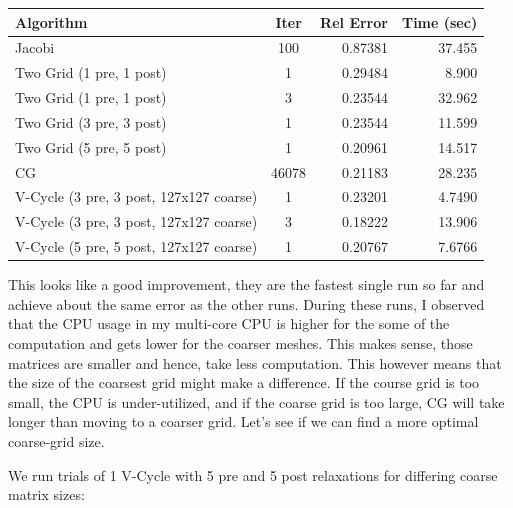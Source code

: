 \documentclass[11pt]{article}
\begin{document}
\begin{center}
\begin{tabular}{lcrr}
  Algorithm & Iter & Rel Error & Time (sec) \\
  \hline
  Jacobi                                  & 100   &  0.87381  & 37.455 \\
  Two Grid (1 pre, 1 post)                & 1	    &  0.29484  &  8.900 \\
  Two Grid (1 pre, 1 post)                & 3	    &  0.23544  & 32.962 \\
  Two Grid (3 pre, 3 post)                & 1	    &  0.23544  & 11.599 \\
  Two Grid (5 pre, 5 post)                & 1     &  0.20961  & 14.517 \\
  CG                                      & 46078 &  0.21183  & 28.235 \\
  V-Cycle (3 pre, 3 post, 127x127 coarse) & 1     &  0.23201  & 4.7490 \\
  V-Cycle (3 pre, 3 post, 127x127 coarse) & 3     &  0.18222  & 13.906 \\
  V-Cycle (5 pre, 5 post, 127x127 coarse) & 1     &  0.20767  & 7.6766
\end{tabular}
\end{center}    

    
    This looks like a good improvement, they are the fastest single run so
far and achieve about the same error as the other runs. During these
runs, I observed that the CPU usage in my multi-core CPU is higher for
the some of the computation and gets lower for the coarser meshes. This
makes sense, those matrices are smaller and hence, take less
computation. This however means that the size of the coarsest grid
might make a difference. If the course grid is too small, the CPU is
under-utilized, and if the coarse grid is too large, CG will take longer
than moving to a coarser grid. Let's see if we can find a more optimal
coarse-grid size.

We run trials of 1 V-Cycle with 5 pre and 5 post relaxations for
differing coarse matrix sizes:
\end{document}
